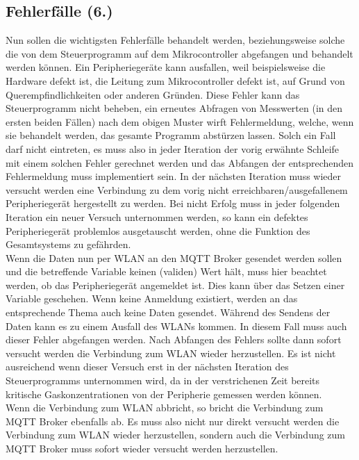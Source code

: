 \documentclass[a4paper, 12pt]{article}
\begin{document}
\subsection{Fehlerfälle (6.)}
Nun sollen die wichtigsten Fehlerfälle behandelt werden, beziehungsweise solche die von dem Steuerprogramm auf dem Mikrocontroller abgefangen und behandelt werden können. Ein Peripheriegeräte kann ausfallen, weil beispielsweise die Hardware defekt ist, die Leitung zum Mikrocontroller defekt ist, auf Grund von Querempfindlichkeiten oder anderen Gründen. Diese Fehler kann das Steuerprogramm nicht beheben, ein erneutes Abfragen von Messwerten (in den ersten beiden Fällen) nach dem obigen Muster wirft Fehlermeldung, welche, wenn sie behandelt werden, das gesamte Programm abstürzen lassen. Solch ein Fall darf nicht eintreten, es muss also in jeder Iteration der vorig erwähnte Schleife mit einem solchen Fehler gerechnet werden und das Abfangen der entsprechenden Fehlermeldung muss implementiert sein. In der nächsten Iteration muss wieder versucht werden eine Verbindung zu dem vorig nicht erreichbaren/ausgefallenem Peripheriegerät hergestellt zu werden. Bei nicht Erfolg muss in jeder folgenden Iteration ein neuer Versuch unternommen werden, so kann ein defektes Peripheriegerät problemlos ausgetauscht werden, ohne die Funktion des Gesamtsystems zu gefährden.\\

Wenn die Daten nun per WLAN an den MQTT Broker gesendet werden sollen und die betreffende Variable keinen (validen) Wert hält, muss hier beachtet werden, ob das Peripheriegerät angemeldet ist. Dies kann über das Setzen einer Variable geschehen. Wenn keine Anmeldung existiert, werden an das entsprechende Thema auch keine Daten gesendet. Während des Sendens der Daten kann es zu einem Ausfall des WLANs kommen. In diesem Fall muss auch dieser Fehler abgefangen werden. Nach Abfangen des Fehlers sollte dann sofort versucht werden die Verbindung zum WLAN wieder herzustellen. Es ist nicht ausreichend wenn dieser Versuch erst in der nächsten Iteration des Steuerprogramms unternommen wird, da in der verstrichenen Zeit bereits kritische Gaskonzentrationen von der Peripherie gemessen werden können.\\
Wenn die Verbindung zum WLAN abbricht, so bricht die Verbindung zum MQTT Broker ebenfalls ab. Es muss also nicht nur direkt versucht werden die Verbindung zum WLAN wieder herzustellen, sondern auch die Verbindung zum MQTT Broker muss sofort wieder versucht werden herzustellen.
\end{document}

